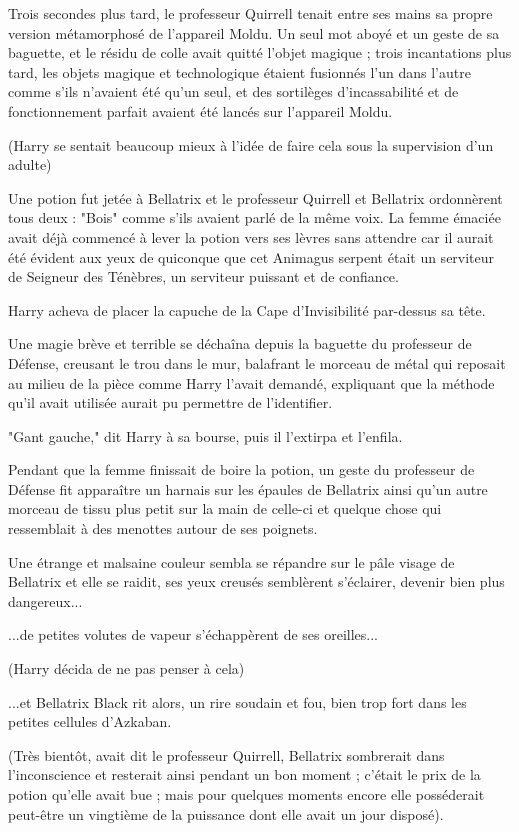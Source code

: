 Trois secondes plus tard, le professeur Quirrell tenait entre ses mains sa propre version métamorphosé de l'appareil Moldu. Un seul mot aboyé et un geste de sa baguette, et le résidu de colle avait quitté l'objet magique ; trois incantations plus tard, les objets magique et technologique étaient fusionnés l'un dans l'autre comme s'ils n'avaient été qu'un seul, et des sortilèges d'incassabilité et de fonctionnement parfait avaient été lancés sur l'appareil Moldu.

(Harry se sentait beaucoup mieux à l'idée de faire cela sous la supervision d'un adulte)

Une potion fut jetée à Bellatrix et le professeur Quirrell et Bellatrix ordonnèrent tous deux : "Bois" comme s'ils avaient parlé de la même voix. La femme émaciée avait déjà commencé à lever la potion vers ses lèvres sans attendre car il aurait été évident aux yeux de quiconque que cet Animagus serpent était un serviteur de Seigneur des Ténèbres, un serviteur puissant et de confiance.

Harry acheva de placer la capuche de la Cape d'Invisibilité par-dessus sa tête.

Une magie brève et terrible se déchaîna depuis la baguette du professeur de Défense, creusant le trou dans le mur, balafrant le morceau de métal qui reposait au milieu de la pièce comme Harry l'avait demandé, expliquant que la méthode qu'il avait utilisée aurait pu permettre de l'identifier.

"Gant gauche," dit Harry à sa bourse, puis il l'extirpa et l'enfila.

Pendant que la femme finissait de boire la potion, un geste du professeur de Défense fit apparaître un harnais sur les épaules de Bellatrix ainsi qu'un autre morceau de tissu plus petit sur la main de celle-ci et quelque chose qui ressemblait à des menottes autour de ses poignets.

Une étrange et malsaine couleur sembla se répandre sur le pâle visage de Bellatrix et elle se raidit, ses yeux creusés semblèrent s'éclairer, devenir bien plus dangereux...

...de petites volutes de vapeur s'échappèrent de ses oreilles...

(Harry décida de ne pas penser à cela)

...et Bellatrix Black rit alors, un rire soudain et fou, bien trop fort dans les petites cellules d'Azkaban.

(Très bientôt, avait dit le professeur Quirrell, Bellatrix sombrerait dans l'inconscience et resterait ainsi pendant un bon moment ; c'était le prix de la potion qu'elle avait bue ; mais pour quelques moments encore elle posséderait peut-être un vingtième de la puissance dont elle avait un jour disposé).

